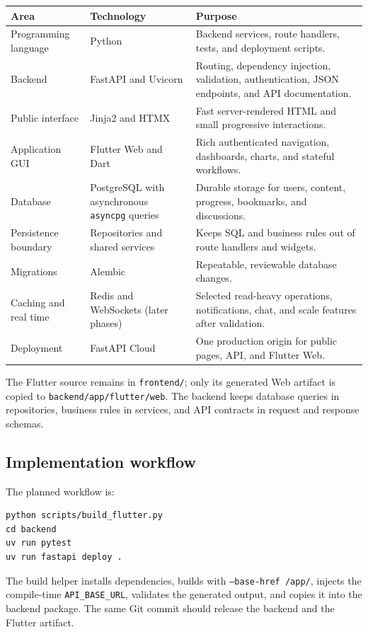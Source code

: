 \documentclass[11pt,a4paper]{article}
\begin{document}
\begin{tabularx}{\linewidth}{@{}p{.24\linewidth}p{.25\linewidth}X@{}}
\toprule
\textbf{Area} & \textbf{Technology} & \textbf{Purpose}\\
\midrule
Programming language & Python & Backend services, route handlers, tests, and deployment scripts.\\
Backend & FastAPI and Uvicorn & Routing, dependency injection, validation, authentication,
JSON endpoints, and API documentation.\\
Public interface & Jinja2 and HTMX & Fast server-rendered HTML and small progressive interactions.\\
Application GUI & Flutter Web and Dart & Rich authenticated navigation, dashboards, charts, and stateful workflows.\\
Database & PostgreSQL with asynchronous \texttt{asyncpg} queries & Durable storage for users, content, progress, bookmarks, and discussions.\\
Persistence boundary & Repositories and shared services & Keeps SQL and business rules out of route handlers and widgets.\\
Migrations & Alembic & Repeatable, reviewable database changes.\\
Caching and real time & Redis and WebSockets (later phases) & Selected read-heavy operations, notifications, chat, and scale features after validation.\\
Deployment & FastAPI Cloud & One production origin for public pages, API, and Flutter Web.\\
\bottomrule
\end{tabularx}

The Flutter source remains in \texttt{frontend/}; only its generated Web artifact is
copied to \texttt{backend/app/flutter/web}. The backend keeps database queries in
repositories, business rules in services, and API contracts in request and response
schemas.

\subsection{Implementation workflow}

The planned workflow is:

\begin{lstlisting}
python scripts/build_flutter.py
cd backend
uv run pytest
uv run fastapi deploy .
\end{lstlisting}

The build helper installs dependencies, builds with \texttt{--base-href /app/},
injects the compile-time \texttt{API\_BASE\_URL}, validates the generated output,
and copies it into the backend package. The same Git commit should release the
backend and the Flutter artifact.
\end{document}
